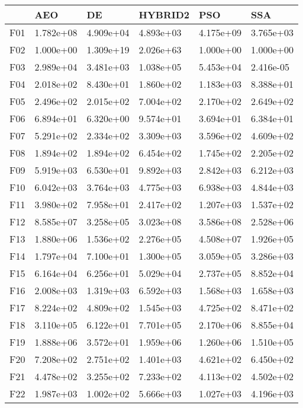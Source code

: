 \begin{tabular}{llllll}
\toprule
{} &        AEO &         DE &    HYBRID2 &        PSO &        SSA \\
\midrule
F01  &  1.782e+08 &  4.909e+04 &  4.893e+03 &  4.175e+09 &  3.765e+03 \\
F02  &  1.000e+00 &  1.309e+19 &  2.026e+63 &  1.000e+00 &  1.000e+00 \\
F03  &  2.989e+04 &  3.481e+03 &  1.038e+05 &  5.453e+04 &  2.416e-05 \\
F04  &  2.018e+02 &  8.430e+01 &  1.860e+02 &  1.183e+03 &  8.388e+01 \\
F05  &  2.496e+02 &  2.015e+02 &  7.004e+02 &  2.170e+02 &  2.649e+02 \\
F06  &  6.894e+01 &  6.320e+00 &  9.574e+01 &  3.694e+01 &  6.384e+01 \\
F07  &  5.291e+02 &  2.334e+02 &  3.309e+03 &  3.596e+02 &  4.609e+02 \\
F08  &  1.894e+02 &  1.894e+02 &  6.454e+02 &  1.745e+02 &  2.205e+02 \\
F09  &  5.919e+03 &  6.530e+01 &  9.892e+03 &  2.842e+03 &  6.212e+03 \\
F10  &  6.042e+03 &  3.764e+03 &  4.775e+03 &  6.938e+03 &  4.844e+03 \\
F11  &  3.980e+02 &  7.958e+01 &  2.417e+02 &  1.207e+03 &  1.537e+02 \\
F12  &  8.585e+07 &  3.258e+05 &  3.023e+08 &  3.586e+08 &  2.528e+06 \\
F13  &  1.880e+06 &  1.536e+02 &  2.276e+05 &  4.508e+07 &  1.926e+05 \\
F14  &  1.797e+04 &  7.100e+01 &  1.300e+05 &  3.059e+05 &  3.286e+03 \\
F15  &  6.164e+04 &  6.256e+01 &  5.029e+04 &  2.737e+05 &  8.852e+04 \\
F16  &  2.008e+03 &  1.319e+03 &  6.592e+03 &  1.568e+03 &  1.658e+03 \\
F17  &  8.224e+02 &  4.809e+02 &  1.545e+03 &  4.725e+02 &  8.471e+02 \\
F18  &  3.110e+05 &  6.122e+01 &  7.701e+05 &  2.170e+06 &  8.855e+04 \\
F19  &  1.888e+06 &  3.572e+01 &  1.959e+06 &  1.260e+06 &  1.510e+05 \\
F20  &  7.208e+02 &  2.751e+02 &  1.401e+03 &  4.621e+02 &  6.450e+02 \\
F21  &  4.478e+02 &  3.255e+02 &  7.233e+02 &  4.113e+02 &  4.502e+02 \\
F22  &  1.987e+03 &  1.002e+02 &  5.666e+03 &  1.027e+03 &  4.196e+03 \\

\end{tabular}
